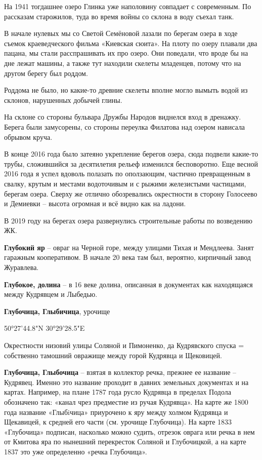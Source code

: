 На 1941 тогдашнее озеро Глинка уже наполовину совпадает с современным. По рассказам старожилов, туда во время войны со склона в воду съехал танк.

В начале нулевых мы со Светой Семёновой лазали по берегам озера в ходе съемок краеведческого фильма «Киевская сюита». На плоту по озеру плавали два пацана, мы стали расспрашивать их про озеро. Они поведали, что вроде бы на дне лежат машины, а также тут находили скелеты младенцев, потому что на другом берегу был роддом.

Роддома не было, но какие-то древние скелеты вполне могло вымыть водой из склонов, нарушенных добычей глины.

На склоне со стороны бульвара Дружбы Народов виднелся вход в дренажку. Берега были замусорены, со стороны переулка Филатова над озером нависала обрывом круча.

В конце 2016 года было затеяно укрепление берегов озера, сюда подвели какие-то трубы, сложившийся за десятилетия рельеф изменился бесповоротно. Еще весной 2016 года я успел вдоволь полазать по оползающим, частично превращенным в свалку, крутым и местами водоточивым и с рыжими железистыми частицами, берегам озера. Сверху же отлично обозревались окрестности в сторону Голосеево и Демиевки – высота огромная и всё видно как на ладони.

В 2019 году на берегах озера развернулись строительные работы по возведению ЖК.\\

\medskip


\textbf{Глубокий яр} – овраг на Черной горе, между улицами Тихая и Мендлеева. Занят гаражным кооперативом. В начале 20 века там был, вероятно, кирпичный завод Журавлева.\\

\medskip

\textbf{Глубокое, долина} – в 16 веке долина, описанная в документах как находящаяся между Кудрявцем и Лыбедью.\\

\medskip

\textbf{Глубочица, Глыбичица}, урочище

50°27'44.8"N 30°29'28.5"E

Окрестности низовий улицы Соляной и Пимоненко, да Кудрявского спуска = собственно тамошний овражище между горой Кудрявца и Щековицей.\\

\medskip


\textbf{Глубочица, Глыбочица} – взятая в коллектор речка, прежнее ее название – Кудрявец. Именно это название проходит в давних земельных документах и на картах. Например, на плане 1787 года русло Кудрявца в пределах Подола обозначено так: «канал чрез предместие из ручая Кудрявца». На карте же 1800 года название «Глыбiчица» приурочено к яру между холмом Кудрявца и Щекавицей, к средней его части (см. урочище Глубочица). На карте 1833 «Глубочица» подписан, насколько можно судить, отрезок оврага или речка в нем от Кмитова яра по нынешний перекресток Соляной и Глубочицкой, а на карте 1837 это уже определенно «речка Глубочица».

